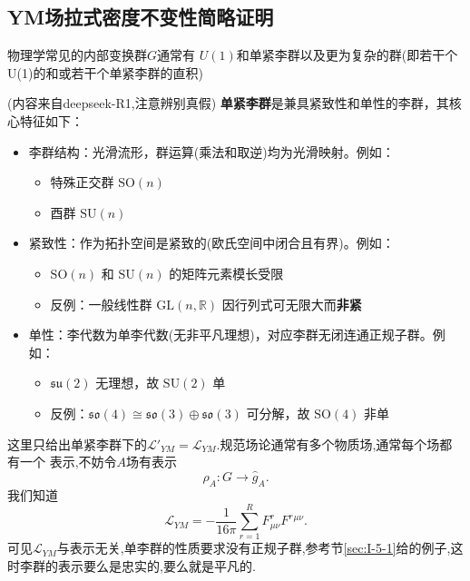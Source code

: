 \documentclass[../main.tex]{subfiles}
\begin{document}
 \subsection{YM场拉式密度不变性简略证明}
 \label{sec:I-5-3}
 物理学常见的内部变换群$G$通常有 $U(1)$和单紧李群以及更为复杂的群(即若干个U(1)的和或若干个单紧李群的直积)
 \begin{note}{\color{red}(内容来自deepseek-R1,注意辨别真假)}
   \textbf{单紧李群}是兼具紧致性和单性的李群，其核心特征如下：

   \begin{itemize}
       \item {李群结构}：光滑流形，群运算(乘法和取逆)均为光滑映射。例如：
           \begin{itemize}
               \item 特殊正交群 $\text{SO}(n)$
               \item 酉群 $\text{SU}(n)$
           \end{itemize}

       \item {紧致性}：作为拓扑空间是紧致的(欧氏空间中闭合且有界)。例如：
           \begin{itemize}
               \item $\text{SO}(n)$ 和 $\text{SU}(n)$ 的矩阵元素模长受限
               \item 反例：一般线性群 $\text{GL}(n, \mathbb{R})$ 因行列式可无限大而\textbf{非紧}
           \end{itemize}

       \item {单性}：李代数为单李代数(无非平凡理想)，对应李群无闭连通正规子群。例如：
           \begin{itemize}
               \item $\mathfrak{su}(2)$ 无理想，故 $\text{SU}(2)$ 单
               \item 反例：$\mathfrak{so}(4) \cong \mathfrak{so}(3) \oplus \mathfrak{so}(3)$ 可分解，故 $\text{SO}(4)$ 非单
           \end{itemize}
   \end{itemize}
 \end{note}
 这里只给出单紧李群下的$\mathscr{L}'_{Y\!M} = \mathscr{L}_{Y\!M}$.规范场论通常有多个物质场,通常每个场都有一个
 表示,不妨令$A$场有表示 \[
 \rho_A : G \to \hat{g}_A 
 .\] 
 我们知道\[
 \mathscr{L}_{Y\!M} = -\frac{1}{16\pi}\sum_{r = 1}^{R} F^r_{\mu\nu}F^{r}{}^{\mu\nu}
 .\] 
 可见$\mathscr{L}_{YM}$与表示无关,单李群的性质要求没有正规子群,参考节\ref{sec:I-5-1}给的例子,这时李群的表示要么是忠实的,要么就是平凡的.
\end{document}
